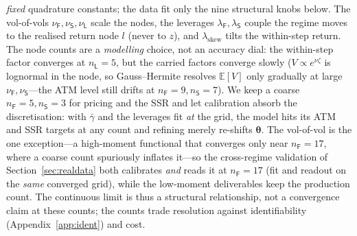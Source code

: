 \documentclass[11pt]{article}
\newcommand{\E}{\mathbb{E}}
\newcommand{\bth}{{\boldsymbol{\theta}}}
\begin{document}
\emph{fixed} quadrature constants; the data fit only the nine structural knobs below. The vol-of-vols
$\nu_{\mathsf{F}},\nu_{\mathsf{S}},\nu_{\mathsf{L}}$ scale the nodes, the leverages $\lambda_{\mathsf{F}},\lambda_{\mathsf{S}}$ couple
the regime moves to the realised return node $l$ (never to $z$), and $\lambda_{\mathrm{skew}}$ tilts the
within-step return. The node counts are a \emph{modelling} choice, not an accuracy dial: the within-step
factor converges at $n_{\mathsf{L}}=5$, but the carried factors converge slowly ($V\propto e^{\nu\zeta}$
is lognormal in the node, so Gauss--Hermite resolves $\E[V]$ only gradually at large
$\nu_{\mathsf{F}},\nu_{\mathsf{S}}$---the ATM level still drifts at $n_{\mathsf{F}}=9,n_{\mathsf{S}}=7$). We keep a coarse
$n_{\mathsf{F}}=5,n_{\mathsf{S}}=3$ for pricing and the SSR and let calibration absorb the discretisation: with $\bar\gamma$ and the
leverages fit \emph{at} the grid, the model hits its ATM and SSR targets at any count and refining merely
re-shifts $\bth$. The vol-of-vol is the one exception---a high-moment functional that converges only near
$n_{\mathsf{F}}{=}17$, where a coarse count spuriously inflates it---so the cross-regime validation of
Section~\ref{sec:realdata} both calibrates \emph{and} reads it at $n_{\mathsf{F}}{=}17$ (fit and readout on the
\emph{same} converged grid), while the low-moment deliverables keep the production count. The continuous limit is thus a structural relationship, not a convergence claim at these
counts; the counts trade resolution against identifiability (Appendix~\ref{app:ident}) and cost.
\end{document}
